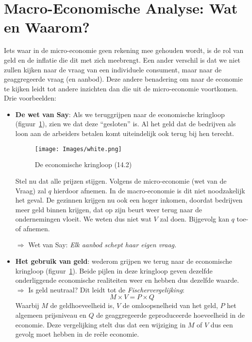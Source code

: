 \section{Macro-Economische Analyse: Wat en Waarom?}
Iets waar in de micro-economie geen rekening mee gehouden wordt, is de rol van geld en de inflatie die dit met zich meebrengt. Een ander verschil is dat we niet zullen kijken naar de vraag van een individuele consument, maar naar de geaggregeerde vraag (en aanbod). Deze andere benadering om naar de economie te kijken leidt tot andere inzichten dan die uit de micro-economie voortkomen. Drie voorbeelden:
\begin{itemize}
    \item \textbf{De wet van Say}: Als we teruggrijpen naar de economische kringloop (figuur~\ref{fig:economischeKringloop}), zien we dat deze ``gesloten'' is. Al het geld dat de bedrijven als loon aan de arbeiders betalen komt uiteindelijk ook terug bij hen terecht.
    \begin{figure}[htbp]
        \centering
        \texttt{[image: Images/white.png]}
        \caption{De economische kringloop (14.2)}
        \label{fig:economischeKringloop}
    \end{figure}

    Stel nu dat alle prijzen stijgen. Volgens de micro-economie (wet van de Vraag) zal $q$ hierdoor afnemen. In de macro-economie is dit niet noodzakelijk het geval. De gezinnen krijgen nu ook een hoger inkomen, doordat bedrijven meer geld binnen krijgen, dat op zijn beurt weer terug naar de ondernemingen vloeit. We weten dus niet wat $V$ zal doen. Bijgevolg kan $q$ toe- of afnemen.

    $\Rightarrow$ Wet van Say: \textit{Elk aanbod schept haar eigen vraag.}

    \item \textbf{Het gebruik van geld}: wederom grijpen we terug naar de economische kringloop (figuur~\ref{fig:economischeKringloop}). Beide pijlen in deze kringloop geven dezelfde onderliggende economische realiteiten weer en hebben dus dezelfde waarde.
    $\Rightarrow$ Is geld neutraal? Dit leidt tot de \textit{Fischervergelijking}:
    \begin{equation}
        M \times V = P \times Q
    \end{equation}
    Waarbij $M$ de geldhoeveelheid is, $V$ de omloopsnelheid van het geld, $P$ het algemeen prijsniveau en $Q$ de geaggregeerde geproduceerde hoeveelheid in de economie. Deze vergelijking stelt dus dat een wijziging in $M$ of $V$ dus een gevolg moet hebben in de re\"ele economie.


\end{itemize}
